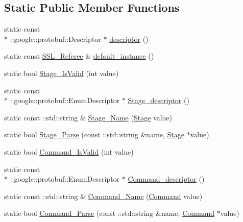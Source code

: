 \subsection*{Static Public Member Functions}
\begin{DoxyCompactItemize}
\item 
static const \\*
\-::google\-::protobuf\-::\-Descriptor $\ast$ \hyperlink{class_s_s_l___referee_a28235794db1f430dd76f81ee54b0c44c}{descriptor} ()
\item 
static const \hyperlink{class_s_s_l___referee}{S\-S\-L\-\_\-\-Referee} \& \hyperlink{class_s_s_l___referee_a8ec941a9b0bdd0f7525f6e02406c1886}{default\-\_\-instance} ()
\item 
static bool \hyperlink{class_s_s_l___referee_a570378de77230c879584cad1b61e011d}{Stage\-\_\-\-Is\-Valid} (int value)
\item 
static const \\*
\-::google\-::protobuf\-::\-Enum\-Descriptor $\ast$ \hyperlink{class_s_s_l___referee_a9063d4d705ddda704b342f5106ab3706}{Stage\-\_\-descriptor} ()
\item 
static const \-::std\-::string \& \hyperlink{class_s_s_l___referee_a69e1ce0867e0565721c11e0226285b8d}{Stage\-\_\-\-Name} (\hyperlink{referee_8pb_8h_a38b80041d0259d508796c1bc7ab57c4c}{Stage} value)
\item 
static bool \hyperlink{class_s_s_l___referee_a23d1caaf195b2d2cb29f653a811fde51}{Stage\-\_\-\-Parse} (const \-::std\-::string \&name, \hyperlink{referee_8pb_8h_a38b80041d0259d508796c1bc7ab57c4c}{Stage} $\ast$value)
\item 
static bool \hyperlink{class_s_s_l___referee_a782b2511269a92d6c1f0aa6e96781503}{Command\-\_\-\-Is\-Valid} (int value)
\item 
static const \\*
\-::google\-::protobuf\-::\-Enum\-Descriptor $\ast$ \hyperlink{class_s_s_l___referee_a369e9deb8232507ab22f283c5a036893}{Command\-\_\-descriptor} ()
\item 
static const \-::std\-::string \& \hyperlink{class_s_s_l___referee_aa88421e95bd48e01bf9d053e399c30ff}{Command\-\_\-\-Name} (\hyperlink{referee_8pb_8h_a25bd5aba081a4c85e54d6ed275358d79}{Command} value)
\item 
static bool \hyperlink{class_s_s_l___referee_a490c8bbe294617764af819923d7f05e3}{Command\-\_\-\-Parse} (const \-::std\-::string \&name, \hyperlink{referee_8pb_8h_a25bd5aba081a4c85e54d6ed275358d79}{Command} $\ast$value)
\end{DoxyCompactItemize}
